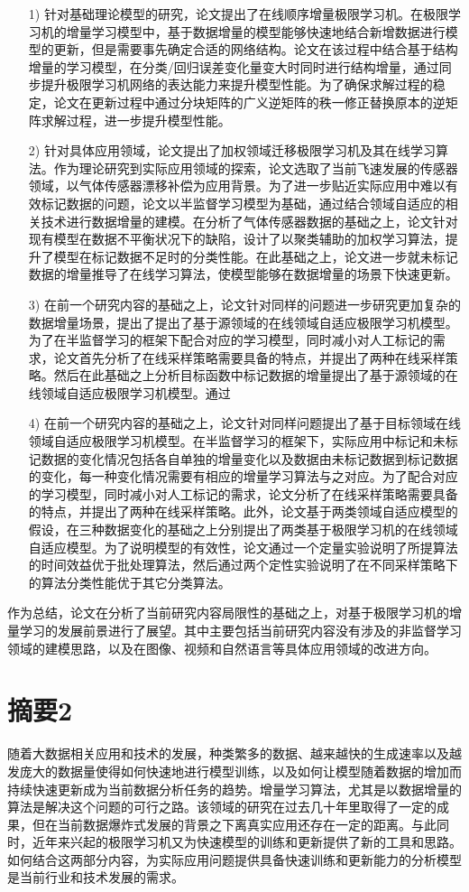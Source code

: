 \begin{enumerate}
\item[1)]针对基础理论模型的研究，论文提出了在线顺序增量极限学习机。在极限学习机的增量学习模型中，基于数据增量的模型能够快速地结合新增数据进行模型的更新，但是需要事先确定合适的网络结构。论文在该过程中结合基于结构增量的学习模型，在分类/回归误差变化量变大时同时进行结构增量，通过同步提升极限学习机网络的表达能力来提升模型性能。为了确保求解过程的稳定，论文在更新过程中通过分块矩阵的广义逆矩阵的秩一修正替换原本的逆矩阵求解过程，进一步提升模型性能。
\item[2)]针对具体应用领域，论文提出了加权领域迁移极限学习机及其在线学习算法。作为理论研究到实际应用领域的探索，论文选取了当前飞速发展的传感器领域，以气体传感器漂移补偿为应用背景。为了进一步贴近实际应用中难以有效标记数据的问题，论文以半监督学习模型为基础，通过结合领域自适应的相关技术进行数据增量的建模。在分析了气体传感器数据的基础之上，论文针对现有模型在数据不平衡状况下的缺陷，设计了以聚类辅助的加权学习算法，提升了模型在标记数据不足时的分类性能。在此基础之上，论文进一步就未标记数据的增量推导了在线学习算法，使模型能够在数据增量的场景下快速更新。
\item[3)]在前一个研究内容的基础之上，论文针对同样的问题进一步研究更加复杂的数据增量场景，提出了提出了基于源领域的在线领域自适应极限学习机模型。为了在半监督学习的框架下配合对应的学习模型，同时减小对人工标记的需求，论文首先分析了在线采样策略需要具备的特点，并提出了两种在线采样策略。然后在此基础之上分析目标函数中标记数据的增量提出了基于源领域的在线领域自适应极限学习机模型。通过

\item[4)]在前一个研究内容的基础之上，论文针对同样问题提出了基于目标领域在线领域自适应极限学习机模型。在半监督学习的框架下，实际应用中标记和未标记数据的变化情况包括各自单独的增量变化以及数据由未标记数据到标记数据的变化，每一种变化情况需要有相应的增量学习算法与之对应。为了配合对应的学习模型，同时减小对人工标记的需求，论文分析了在线采样策略需要具备的特点，并提出了两种在线采样策略。此外，论文基于两类领域自适应模型的假设，在三种数据变化的基础之上分别提出了两类基于极限学习机的在线领域自适应模型。为了说明模型的有效性，论文通过一个定量实验说明了所提算法的时间效益优于批处理算法，然后通过两个定性实验说明了在不同采样策略下的算法分类性能优于其它分类算法。
\end{enumerate}
作为总结，论文在分析了当前研究内容局限性的基础之上，对基于极限学习机的增量学习的发展前景进行了展望。其中主要包括当前研究内容没有涉及的非监督学习领域的建模思路，以及在图像、视频和自然语言等具体应用领域的改进方向。

\section{摘要2}
随着大数据相关应用和技术的发展，种类繁多的数据、越来越快的生成速率以及越发庞大的数据量使得如何快速地进行模型训练，以及如何让模型随着数据的增加而持续快速更新成为当前数据分析任务的趋势。增量学习算法，尤其是以数据增量的算法是解决这个问题的可行之路。该领域的研究在过去几十年里取得了一定的成果，但在当前数据爆炸式发展的背景之下离真实应用还存在一定的距离。与此同时，近年来兴起的极限学习机又为快速模型的训练和更新提供了新的工具和思路。如何结合这两部分内容，为实际应用问题提供具备快速训练和更新能力的分析模型是当前行业和技术发展的需求。


